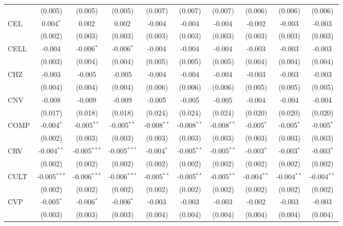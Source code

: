 \begin{table}[!htbp]
\begin{tabular}{@{\extracolsep{5pt}}lccccccccc}
  & (0.005) & (0.005) & (0.005) & (0.007) & (0.007) & (0.007) & (0.006) & (0.006) & (0.006) \\
 CEL & 0.004$^{*}$ & 0.002$^{}$ & 0.002$^{}$ & -0.004$^{}$ & -0.004$^{}$ & -0.004$^{}$ & -0.002$^{}$ & -0.003$^{}$ & -0.003$^{}$ \\
  & (0.002) & (0.003) & (0.003) & (0.003) & (0.003) & (0.003) & (0.003) & (0.003) & (0.003) \\
 CELL & -0.004$^{}$ & -0.006$^{*}$ & -0.006$^{*}$ & -0.004$^{}$ & -0.004$^{}$ & -0.004$^{}$ & -0.003$^{}$ & -0.003$^{}$ & -0.003$^{}$ \\
  & (0.003) & (0.004) & (0.004) & (0.005) & (0.005) & (0.005) & (0.004) & (0.004) & (0.004) \\
 CHZ & -0.003$^{}$ & -0.005$^{}$ & -0.005$^{}$ & -0.004$^{}$ & -0.004$^{}$ & -0.004$^{}$ & -0.003$^{}$ & -0.003$^{}$ & -0.003$^{}$ \\
  & (0.004) & (0.004) & (0.004) & (0.006) & (0.006) & (0.006) & (0.005) & (0.005) & (0.005) \\
 CNV & -0.008$^{}$ & -0.009$^{}$ & -0.009$^{}$ & -0.005$^{}$ & -0.005$^{}$ & -0.005$^{}$ & -0.004$^{}$ & -0.004$^{}$ & -0.004$^{}$ \\
  & (0.017) & (0.018) & (0.018) & (0.024) & (0.024) & (0.024) & (0.020) & (0.020) & (0.020) \\
 COMP & -0.004$^{*}$ & -0.005$^{**}$ & -0.005$^{**}$ & -0.008$^{**}$ & -0.008$^{**}$ & -0.008$^{**}$ & -0.005$^{*}$ & -0.005$^{*}$ & -0.005$^{*}$ \\
  & (0.002) & (0.003) & (0.003) & (0.003) & (0.003) & (0.003) & (0.003) & (0.003) & (0.003) \\
 CRV & -0.004$^{**}$ & -0.005$^{***}$ & -0.005$^{***}$ & -0.004$^{*}$ & -0.005$^{**}$ & -0.005$^{**}$ & -0.003$^{*}$ & -0.003$^{*}$ & -0.003$^{*}$ \\
  & (0.002) & (0.002) & (0.002) & (0.002) & (0.002) & (0.002) & (0.002) & (0.002) & (0.002) \\
 CULT & -0.005$^{***}$ & -0.006$^{***}$ & -0.006$^{***}$ & -0.005$^{**}$ & -0.005$^{**}$ & -0.005$^{**}$ & -0.004$^{**}$ & -0.004$^{**}$ & -0.004$^{**}$ \\
  & (0.002) & (0.002) & (0.002) & (0.002) & (0.002) & (0.002) & (0.002) & (0.002) & (0.002) \\
 CVP & -0.005$^{*}$ & -0.006$^{*}$ & -0.006$^{*}$ & -0.003$^{}$ & -0.003$^{}$ & -0.003$^{}$ & -0.002$^{}$ & -0.003$^{}$ & -0.003$^{}$ \\
  & (0.003) & (0.003) & (0.003) & (0.004) & (0.004) & (0.004) & (0.004) & (0.004) & (0.004) \\

\end{tabular}
\end{table}
